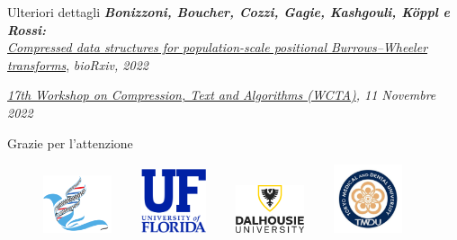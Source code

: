 \documentclass[]{beamer}
\begin{document}
\begin{frame}{}
  \begin{block}{Ulteriori dettagli}
    \footnotesize{\textit{\textbf{Bonizzoni, Boucher, Cozzi, Gagie, Kashgouli,
          K\"{o}ppl e Rossi:} \\\underline{Compressed data structures for
          population-scale positional Burrows--Wheeler transforms}},
      \textit{bioRxiv, 2022}} 
  \end{block}
  \begin{block}{}
    \footnotesize{\textit{\underline{17th Workshop on Compression, Text and
          Algorithms (WCTA)}, 11 Novembre 2022}}  
  \end{block}
  \begin{alertblock}{}
    \begin{center}
       {\LARGE{Grazie per l'attenzione}}
    \end{center}
  \end{alertblock}
  \vspace{-0.2cm}
  \begin{figure}[H]
    \centering
    \includegraphics[width = 0.18\textwidth]{img/logo-bias.pdf}$\quad\quad$
    \includegraphics[width = 0.17\textwidth]{img/ufl.png}$\quad\quad$
    \includegraphics[width = 0.18\textwidth]{img/dal.png}$\quad\quad$
    \includegraphics[width = 0.18\textwidth]{img/tmdu.jpg}
  \end{figure}
\end{frame}
\appendix
\end{document}

